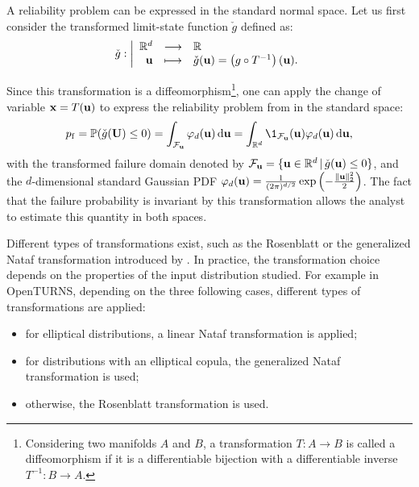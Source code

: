 A reliability problem can be expressed in the standard normal space. 
Let us first consider the transformed limit-state function $\check{g}$ defined as: 
\begin{equation}
    \check{g} : \bigg|
    \begin{array}{rcl}
        \mathbb{R}^d & \longrightarrow & \mathbb{R}\\
        {\bf u} & \longmapsto & \check{g}({\bf u}) = \left(g \circ T^{-1}\right)({\bf u}).
    \end{array}
\end{equation}

Since this transformation is a diffeomorphism\footnote{Considering two manifolds $A$ and $B$, a transformation $T: A \rightarrow B$ is called a diffeomorphism if it is a differentiable bijection with a differentiable inverse $T^{-1} : B \rightarrow A$.}, 
one can apply the change of variable ${\bf x} = T({\bf u})$ to express the reliability problem from  in the standard space: 
\begin{equation}
    \pf = \P(\cg(\bU) \leq 0) 
        = \int_{\iF_\bu} \varphi_d(\bu) \, \dd\bu 
        = \int_{\R^d} \1_{\iF_\bu}(\bu) \varphi_d(\bu) \, \dd\bu,
\end{equation}
with the transformed failure domain denoted by $\mathcal{F}_{\bf u} = \{{\bf u} \in \mathbb{R}^d \, | \, \check{g}({\bf u}) \leq 0\}$, 
and the $d$-dimensional standard Gaussian PDF $\varphi_d({\bf u}) = \frac{1}{(2\pi)^{d/2}} \exp\left(-\frac{\lVert{\bf u}\rVert^2_2}{2}\right)$. 
The fact that the failure probability is invariant by this transformation allows the analyst to estimate this quantity in both spaces.  

Different types of transformations exist, such as the Rosenblatt or the generalized Nataf transformation introduced by \citet{Lebrun_PHD_2013}. 
In practice, the transformation choice depends on the properties of the input distribution studied. 
For example in OpenTURNS, depending on the three following cases, different types of transformations are applied:
\begin{itemize}
    \item for elliptical distributions, a linear Nataf transformation is applied;
    \item for distributions with an elliptical copula, the generalized Nataf transformation is used;
    \item otherwise, the Rosenblatt transformation is used.
\end{itemize}  


